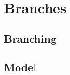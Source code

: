 \section{Branches}

\subsection{Branching}
\frameready{
	
}

\subsection{Model}
\frameready{
	
	
	
	
	
}